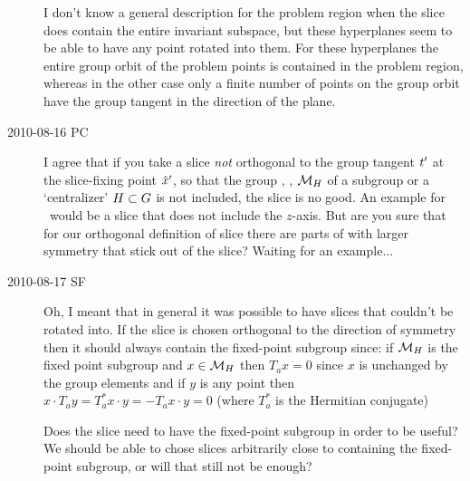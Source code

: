 \begin{description}
I don't know a general description for the problem region
when the slice does contain the entire invariant subspace,
but these hyperplanes seem to be able to have any point
rotated into them. For these hyperplanes the entire group
orbit of the problem points is contained in the problem
region, whereas in the other case only a finite number of
points on the group orbit have the group tangent in the
direction of the plane.

\item[2010-08-16 PC]
I agree that if you take a slice \emph{not} orthogonal to the group
tangent $t'_{}$ at the slice-fixing point ${\hat{x}'}$,
so that the group {\fixedsp}, \ie,
${\cal M}_H$ of a subgroup or a `centralizer' $H \subset G$
 is not included, the slice is no
good. An example for \cLe\ would be a slice
that does not include the $z$-axis.
But are you sure that for our orthogonal definition
of slice there are parts of {\statesp} with larger symmetry
that stick out of the slice? Waiting for an example...

\item[2010-08-17 SF]
Oh, I meant that in general it was possible to have slices that couldn't be rotated into. If the slice is chosen orthogonal to the direction of symmetry then it should always contain the fixed-point subgroup since: if ${\cal M}_H$ is the fixed point subgroup and $x \in {\cal M}_H$ then $T_a x=0$ since $x$ is unchanged by the group elements and if $y$ is any point then $x \cdot T_a y=T_a^* x \cdot y=-T_a x \cdot y=0$ (where $T_a^*$ is the Hermitian conjugate)

Does the slice need to have the fixed-point subgroup in order to be useful? We should be able to chose slices arbitrarily close to containing the fixed-point subgroup, or will that still not be enough?


\end{description}
